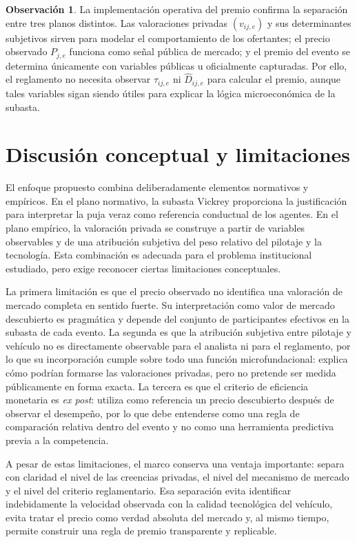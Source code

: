 \documentclass[11pt,a4paper]{article}
\theoremstyle{definition}
\newtheorem{observacion}{Observación}
\begin{document}
\begin{observacion}
La implementación operativa del premio confirma la separación entre tres planos distintos. Las valoraciones privadas $(v_{ij,e})$ y sus determinantes subjetivos sirven para modelar el comportamiento de los ofertantes; el precio observado $P_{j,e}$ funciona como señal pública de mercado; y el premio del evento se determina únicamente con variables públicas u oficialmente capturadas. Por ello, el reglamento no necesita observar $\tau_{ij,e}$ ni $\widehat D_{ij,e}$ para calcular el premio, aunque tales variables sigan siendo útiles para explicar la lógica microeconómica de la subasta.
\end{observacion}
\section{Discusión conceptual y limitaciones}

El enfoque propuesto combina deliberadamente elementos normativos y empíricos. En el plano normativo, la subasta Vickrey proporciona la justificación para interpretar la puja veraz como referencia conductual de los agentes. En el plano empírico, la valoración privada se construye a partir de variables observables y de una atribución subjetiva del peso relativo del pilotaje y la tecnología. Esta combinación es adecuada para el problema institucional estudiado, pero exige reconocer ciertas limitaciones conceptuales.

La primera limitación es que el precio observado no identifica una valoración de mercado completa en sentido fuerte. Su interpretación como valor de mercado descubierto es pragmática y depende del conjunto de participantes efectivos en la subasta de cada evento. La segunda es que la atribución subjetiva entre pilotaje y vehículo no es directamente observable para el analista ni para el reglamento, por lo que su incorporación cumple sobre todo una función microfundacional: explica cómo podrían formarse las valoraciones privadas, pero no pretende ser medida públicamente en forma exacta. La tercera es que el criterio de eficiencia monetaria es \emph{ex post}: utiliza como referencia un precio descubierto después de observar el desempeño, por lo que debe entenderse como una regla de comparación relativa dentro del evento y no como una herramienta predictiva previa a la competencia.

A pesar de estas limitaciones, el marco conserva una ventaja importante: separa con claridad el nivel de las creencias privadas, el nivel del mecanismo de mercado y el nivel del criterio reglamentario. Esa separación evita identificar indebidamente la velocidad observada con la calidad tecnológica del vehículo, evita tratar el precio como verdad absoluta del mercado y, al mismo tiempo, permite construir una regla de premio transparente y replicable.
\end{document}
